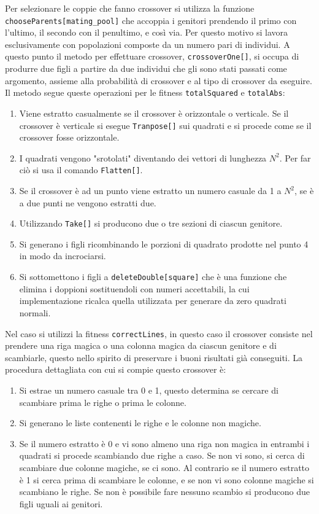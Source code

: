 \documentclass[italian,twoside,twocolumn]{article}
\begin{document}
Per selezionare le coppie che fanno crossover si utilizza la funzione \texttt{chooseParents[mating\_pool]} che accoppia i genitori prendendo il primo con l'ultimo, il secondo con il penultimo, e così via. Per questo motivo si lavora esclusivamente con popolazioni composte da un numero pari di individui. A questo punto il metodo per effettuare crossover, \texttt{crossoverOne[]}, si occupa di produrre due figli a partire da due individui che gli sono stati passati come argomento, assieme alla probabilità di crossover e al tipo di crossover da eseguire. Il metodo segue queste operazioni per le fitness \texttt{totalSquared} e \texttt{totalAbs}:
\begin{enumerate}
	\item Viene estratto casualmente se il crossover è orizzontale o verticale. Se il crossover è verticale si esegue \texttt{Tranpose[]} sui quadrati e si procede come se il crossover fosse orizzontale.
	\item I quadrati vengono "srotolati" diventando dei vettori di lunghezza $ N^2 $. Per far ciò si usa il comando \texttt{Flatten[]}.
	\item Se il crossover è ad un punto viene estratto un numero casuale da 1 a $ N^2 $, se è a due punti ne vengono estratti due.
	\item Utilizzando \texttt{Take[]} si producono due o tre sezioni di ciascun genitore.
	\item Si generano i figli ricombinando le porzioni di quadrato prodotte nel punto 4 in modo da incrociarsi.
	\item Si sottomettono i figli a \texttt{deleteDouble[square]} che è una funzione che elimina i doppioni sostituendoli con numeri accettabili, la cui implementazione ricalca quella utilizzata per generare da zero quadrati normali. 
\end{enumerate}
Nel caso si utilizzi la fitness \texttt{correctLines}, in questo caso il crossover consiste nel prendere una riga magica o una colonna magica da ciascun genitore e di scambiarle, questo nello spirito di preservare i buoni risultati già conseguiti. La procedura dettagliata con cui si compie questo crossover è:
\begin{enumerate}
	\item Si estrae un numero casuale tra 0 e 1, questo determina se cercare di scambiare prima le righe o prima le colonne.
	\item Si generano le liste contenenti le righe e le colonne non magiche.
	\item Se il numero estratto è 0 e vi sono almeno una riga non magica in entrambi i quadrati si procede scambiando due righe a caso. Se non vi sono, si cerca di scambiare due colonne magiche, se ci sono. Al contrario se il numero estratto è 1 si cerca prima di scambiare le colonne, e se non vi sono colonne magiche si scambiano le righe. Se non è possibile fare nessuno scambio si producono due figli uguali ai genitori.
\end{enumerate}
\end{document}
